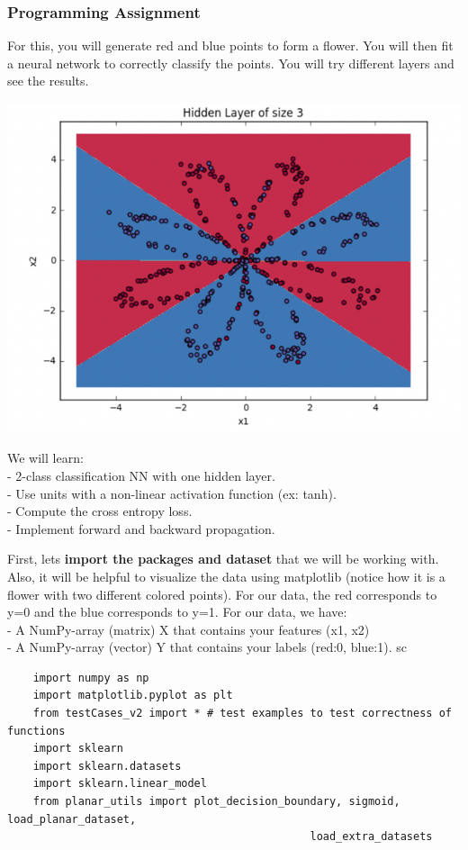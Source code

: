 \documentclass[11pt, a4paper]{article}
\begin{document}
\begin{spacing}{1.1}
	\subsubsection{Programming Assignment}
	For this, you will generate red and blue points to form a flower. You will then fit a neural network to correctly classify the points. You will try different layers and see the results. \vspace*{.5mm} \\
	\begin{minipage}[c]{6.5cm}
	\vspace*{1mm} \includegraphics[scale=0.57]{planar} 
	\end{minipage}
	\begin{minipage}[c]{10cm}
	We will learn: \\
	- 2-class classification NN with one hidden layer. \\
	- Use units with a non-linear activation function (ex: tanh). \\
	- Compute the cross entropy loss. \\
	- Implement forward and backward propagation.
	\end{minipage} \newpage

	\noindent First, lets \textbf{import the packages and dataset} that we will be working with. Also, it will be helpful to visualize the data using matplotlib (notice how it is a flower with two different colored points). For our data, the red corresponds to y=0 and the blue corresponds to y=1. For our data, we have: \\
	\hspace*{3mm} - A NumPy-array (matrix) X that contains your features (x1, x2) \\
	\hspace*{3mm} - A NumPy-array (vector) Y that contains your labels (red:0, blue:1). sc
	\begin{lstlisting}
	import numpy as np
	import matplotlib.pyplot as plt
	from testCases_v2 import * # test examples to test correctness of functions
	import sklearn
	import sklearn.datasets
	import sklearn.linear_model
	from planar_utils import plot_decision_boundary, sigmoid, load_planar_dataset, 
										       load_extra_datasets


\end{lstlisting}
\end{spacing}
\end{document}
